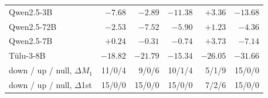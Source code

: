 \begin{center}
\begin{tabular}{lrrrrr}
Qwen2.5-3B & $-7.68$ & $-2.89$ & $-11.38$ & $+3.36$ & \textbf{$-13.68$} \\
Qwen2.5-72B & $-2.53$ & \textbf{$-7.52$} & $-5.90$ & $+1.23$ & \textbf{$-4.36$} \\
Qwen2.5-7B & $+0.24$ & $-0.31$ & $-0.74$ & $+3.73$ & \textbf{$-7.14$} \\
T\"ulu-3-8B & \textbf{$-18.82$} & \textbf{$-21.79$} & \textbf{$-15.34$} & \textbf{$-26.05$} & \textbf{$-31.66$} \\
\midrule
down / up / null, $\Delta M_1$ & 11/0/4 & 9/0/6 & 10/1/4 & 5/1/9 & 15/0/0 \\
down / up / null, $\Delta$1st & 15/0/0 & 15/0/0 & 15/0/0 & 7/2/6 & 15/0/0 \\
\bottomrule\end{tabular}\end{center}
